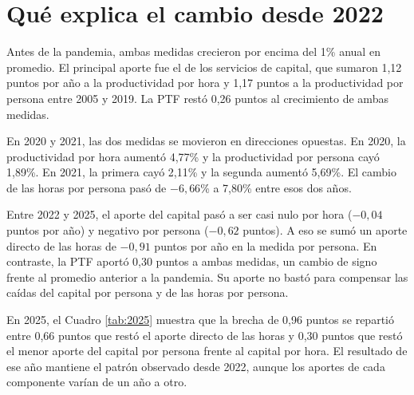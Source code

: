 \begin{table}[H]
\centering
\caption{Descomposición de la productividad laboral en 2025}
\label{tab:2025}

\end{table}

\clearpage
\section{Qué explica el cambio desde 2022}

Antes de la pandemia, ambas medidas crecieron por encima del 1\% anual en promedio. El principal aporte fue el de los servicios de capital, que sumaron 1,12 puntos por año a la productividad por hora y 1,17 puntos a la productividad por persona entre 2005 y 2019. La PTF restó 0,26 puntos al crecimiento de ambas medidas.

\begin{table}[H]
\centering
\caption{Aportes al crecimiento de la productividad laboral por periodo}
\label{tab:periodos}

\end{table}

En 2020 y 2021, las dos medidas se movieron en direcciones opuestas. En 2020, la productividad por hora aumentó 4,77\% y la productividad por persona cayó 1,89\%. En 2021, la primera cayó 2,11\% y la segunda aumentó 5,69\%. El cambio de las horas por persona pasó de $-6{,}66$\% a 7,80\% entre esos dos años.

Entre 2022 y 2025, el aporte del capital pasó a ser casi nulo por hora ($-0{,}04$ puntos por año) y negativo por persona ($-0{,}62$ puntos). A eso se sumó un aporte directo de las horas de $-0{,}91$ puntos por año en la medida por persona. En contraste, la PTF aportó 0,30 puntos a ambas medidas, un cambio de signo frente al promedio anterior a la pandemia. Su aporte no bastó para compensar las caídas del capital por persona y de las horas por persona.

En 2025, el Cuadro \ref{tab:2025} muestra que la brecha de 0,96 puntos se repartió entre 0,66 puntos que restó el aporte directo de las horas y 0,30 puntos que restó el menor aporte del capital por persona frente al capital por hora. El resultado de ese año mantiene el patrón observado desde 2022, aunque los aportes de cada componente varían de un año a otro.

